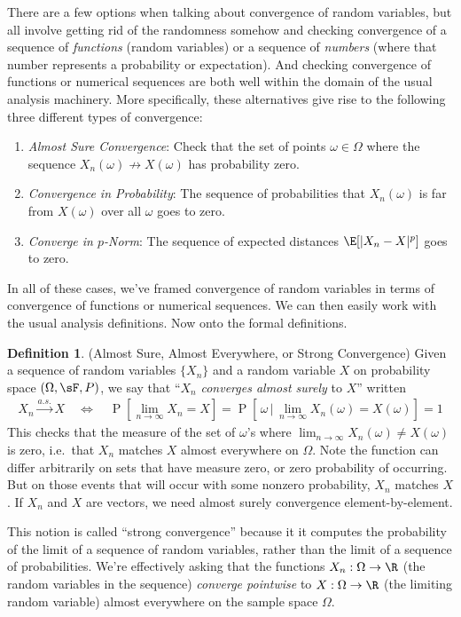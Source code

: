 \documentclass[12pt]{article}
\theoremstyle{plain}
\theoremstyle{definition}
\newtheorem{defn}[thm]{Definition}
\theoremstyle{remark}
\newcommand{\ra}{\rightarrow}
\newcommand{\Prb}{\operatorname{P}}
\newcommand{\asto}{\xrightarrow{a.s.}}
\newcommand{\limn}{\lim_{n\rightarrow\infty}}
\begin{document}
There are a few options when talking about convergence of random
variables, but all involve getting rid of the randomness somehow and
checking convergence of a sequence of \emph{functions} (random
variables) or a sequence of \emph{numbers} (where that number represents
a probability or expectation). And checking convergence of functions or
numerical sequences are both well within the domain of the usual
analysis machinery. More specifically, these alternatives give rise to
the following three different types of convergence:
\begin{enumerate}
  \item \emph{Almost Sure Convergence}: Check that the set of points
    $\omega\in\Omega$ where the sequence $X_n(\omega)\not\ra
    X(\omega)$ has probability zero.
  \item \emph{Convergence in Probability}: The sequence of probabilities
    that $X_n(\omega)$ is far from $X(\omega)$ over all $\omega$ goes to
    zero.
  \item \emph{Converge in $p$-Norm}: The sequence of expected distances
    $\E[|X_n-X|^p]$ goes to zero.
\end{enumerate}
In all of these cases, we've framed convergence of random variables in
terms of convergence of functions or numerical sequences. We can then
easily work with the usual analysis definitions. Now onto the formal
definitions.

\begin{defn}{(Almost Sure, Almost Everywhere, or Strong Convergence)}
Given a sequence of random variables $\{X_n\}$ and a random variable
$X$ on probability space $(\Omega,\sF,P)$, we say that ``$X_n$
\emph{converges almost surely} to $X$'' written
\begin{align*}
  X_n\asto X
  \quad \iff \quad
  \Prb\left[\limn X_n = X\right]
  = \Prb\left[\,\omega \,\big|\,\limn X_n(\omega) = X(\omega)\right]
  = 1
\end{align*}
This checks that the measure of the set of $\omega$'s where
$\limn X_n(\omega)\neq X(\omega)$ is zero, i.e.\ that $X_n$ matches $X$
almost everywhere on $\Omega$.
Note the function can differ arbitrarily on sets that have measure zero,
or zero probability of occurring. But on those events that will occur
with some nonzero probability, $X_n$ matches $X$.  If $X_n$ and $X$ are
vectors, we need almost surely convergence element-by-element.

This notion is called ``strong convergence'' because it it computes the
probability of the limit of a sequence of random variables, rather than
the limit of a sequence of probabilities. We're effectively asking that
the functions $X_n:\Omega\ra\R$ (the random variables in the sequence)
\emph{converge pointwise} to $X:\Omega\ra\R$ (the limiting random
variable) almost everywhere on the sample space $\Omega$.
\end{defn}
\end{document}
